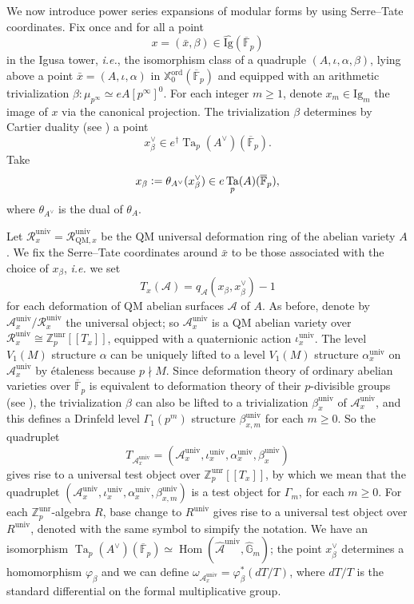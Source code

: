 \documentclass[a4paper,11pt]{amsart}
\numberwithin{equation}{section}
\theoremstyle{plain}
\theoremstyle{definition}
\theoremstyle{remark}
\newcommand{\Z}{\mathbb{Z}}
\newcommand{\F}{\mathbb{F}}
\newcommand{\defeq}{\vcentcolon=}
\DeclareMathOperator{\Hom}{Hom}
\DeclareMathOperator{\Ta}{Ta}
\newcommand{\ord}{\mathrm{ord}}
\newcommand{\univ}{\mathrm{univ}}
\newcommand{\unr}{\mathrm{unr}}
\begin{document}
We now introduce power series expansions of modular forms by using Serre--Tate coordinates. Fix once and for all 
a point \begin{equation}\label{point-fix}
{x}=(\bar{x},\beta)\in \widehat{\text{Ig}}(\overline{\F}_p)\end{equation} in the Igusa tower, \emph{i.e.}, the isomorphism class of a quadruple $(A, \iota, \alpha,\beta)$, lying above a point $\bar{x} =(A, \iota, \alpha)$ in $\mathbb{X}^{\ord}_0(\overline{\F}_p)$ and equipped with an arithmetic trivialization $\beta\colon \mu_{p^\infty}\simeq eA[p^\infty]^0$. 
For each integer $m\geq 1$, denote $x_m\in \mathrm{Ig}_m$ the 
image of $x$ via the canonical projection. The trivialization $\beta$ determines by Cartier duality (see \cite[\S 3.1]{Magrone}) a point \[x_{\beta}^\vee\in e^\dagger{\Ta_p(A^\vee)({\overline{\F}_p})}.\]  
Take \[x_\beta\defeq\theta_{A^\vee}(x_\beta^\vee) \in e\Ta_p(A)(\overline{\F}_p),\] where $\theta_{A^\vee}$ is the dual of $\theta_A$. 

Let $\mathcal{R}^\univ_x=\mathcal{R}^\univ_{\mathrm{QM},x}$ be the QM universal deformation ring of the abelian variety $A$. We fix the Serre--Tate coordinates around $\bar{x}$ to be those associated with the choice of $x_\beta$, \emph{i.e.} we set \[T_x(\mathcal{A})=q_{\mathcal{A}}(x_\beta,x_\beta^\vee)-1\] for each deformation of QM abelian surfaces $\mathcal{A}$ of $A$. As before, denote by $\mathcal{A}^\univ_x/\mathcal{R}^\univ_x$ the universal object; so  $\mathcal{A}^\univ_x$ is a QM abelian variety over $\mathcal{R}_x^\univ \cong \Z_p^\unr[[T_x]]$, equipped with a quaternionic action $\iota_x^\univ$. The level $V_1(M)$ structure $\alpha$ can be uniquely lifted to a level $V_1(M)$ structure $\alpha^\univ_x$ on $\mathcal{A}^\univ_x$ by \'etaleness because $p\nmid M$. Since deformation theory of ordinary abelian varieties over $\overline{\F}_p$ is equivalent to deformation theory of their $p$-divisible groups (see \cite[Theorem 1.2.1]{KatzST}), the trivialization $\beta$ can also be lifted to a trivialization $\beta_x^\univ$ of $\mathcal{A}_x^\univ$, and this defines a Drinfeld level $\Gamma_1(p^m)$ structure $\beta_{x,m}^\univ$ for each $m\geq 0$.
So the  quadruplet 
\[T_{\mathcal{A}_x^\univ}=(\mathcal{A}_x^\univ,\iota_x^\univ,\alpha_x^\univ,\beta_x^\univ)\] gives rise to a universal test object over $\Z_p^\unr[[T_x]]$, by which we mean 
that the quadruplet $(\mathcal{A}_x^\univ,\iota_x^\univ,\alpha_x^\univ,\beta_{x,m}^\univ)$
is a test object for $\Gamma_m$, for each $m\geq 0$. For each $\Z_p^\unr$-algebra $R$, base change to $R^\univ$ gives rise to a universal test object over $R^\mathrm{univ}$, denoted with the same symbol to simpify the notation.
We have an isomorphism ${\Ta_p(A^\vee)({\overline{\F}_p})}\simeq \Hom(\widehat{\mathcal{A}}^\univ,\widehat{\mathbb{G}}_m)$; the point $x_{\beta}^\vee$ determines a homomorphism $\varphi_\beta$ and we can define $\omega_{\mathcal{A}_x^\univ}=\varphi_\beta^*(dT/T)$, where $dT/T$ is the standard differential on the formal multiplicative group. 
\end{document}
